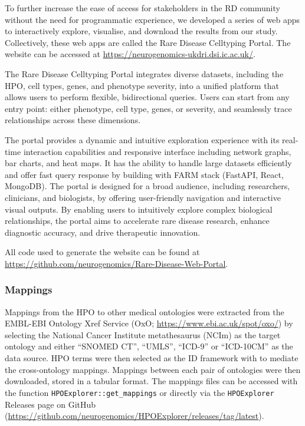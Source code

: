 \documentclass[
]{article}
\begin{document}
To further increase the ease of access for stakeholders in the RD
community without the need for programmatic experience, we developed a
series of web apps to interactively explore, visualise, and download the
results from our study. Collectively, these web apps are called the Rare
Disease Celltyping Portal. The website can be accessed at
\url{https://neurogenomics-ukdri.dsi.ic.ac.uk/}.

The Rare Disease Celltyping Portal integrates diverse datasets,
including the HPO, cell types, genes, and phenotype severity, into a
unified platform that allows users to perform flexible, bidirectional
queries. Users can start from any entry point: either phenotype, cell
type, genes, or severity, and seamlessly trace relationships across
these dimensions.

The portal provides a dynamic and intuitive exploration experience with
its real-time interaction capabilities and responsive interface
including network graphs, bar charts, and heat maps. It has the ability
to handle large datasets efficiently and offer fast query response by
building with FARM stack (FastAPI, React, MongoDB). The portal is
designed for a broad audience, including researchers, clinicians, and
biologists, by offering user-friendly navigation and interactive visual
outputs. By enabling users to intuitively explore complex biological
relationships, the portal aims to accelerate rare disease research,
enhance diagnostic accuracy, and drive therapeutic innovation.

All code used to generate the website can be found at
\url{https://github.com/neurogenomics/Rare-Disease-Web-Portal}.

\subsubsection{Mappings}\label{mappings-1}

Mappings from the HPO to other medical ontologies were extracted from
the EMBL-EBI Ontology Xref Service (OxO;
\url{https://www.ebi.ac.uk/spot/oxo/}) by selecting the National Cancer
Institute metathesaurus (NCIm) as the target ontology and either
``SNOMED CT'', ``UMLS'', ``ICD-9'' or ``ICD-10CM'' as the data source.
HPO terms were then selected as the ID framework with to mediate the
cross-ontology mappings. Mappings between each pair of ontologies were
then downloaded, stored in a tabular format. The mappings files can be
accessed with the function \texttt{HPOExplorer::get\_mappings} or
directly via the \texttt{HPOExplorer} Releases page on GitHub
(\url{https://github.com/neurogenomics/HPOExplorer/releases/tag/latest}).
\end{document}
